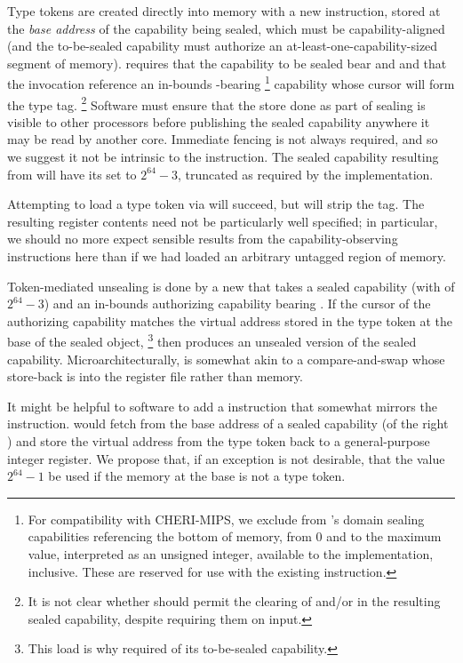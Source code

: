 Type tokens are created directly into memory with a new 
instruction, stored at the \emph{base address} of the capability
being sealed, which must be capability-aligned (and the to-be-sealed
capability must authorize an at-least-one-capability-sized segment of
memory).   requires that the capability to be sealed
bear \cappermL and \cappermS and that the invocation reference an
in-bounds \cappermSeal-bearing%
%
\footnote{For compatibility with CHERI-MIPS, we exclude from
's domain sealing capabilities referencing the
bottom of memory, from $0$ and to the maximum \cotype{} value, interpreted
as an unsigned integer, available to the implementation, inclusive. These are
reserved for use with the existing  instruction.}
%
capability whose cursor will form the type tag.%
%
\footnote{It is not clear whether  should permit the
clearing of \cappermL and/or \cappermS in the resulting sealed
capability, despite requiring them on input.}
%
Software must ensure that the store done as part of sealing is visible to
other processors before publishing the sealed capability anywhere it may be
read by another core.  Immediate fencing is not always required, and so we
suggest it not be intrinsic to the  instruction.
%
The sealed capability resulting from  will have its
\cotype{} set to $2^{64} - 3$, truncated as required by the implementation.

Attempting to load a type token via  will succeed, but will
strip the tag.  The resulting register contents need not be particularly
well specified; in particular, we should no more expect sensible results
from the capability-observing instructions here than if we had loaded an
arbitrary untagged region of memory.

Token-mediated unsealing is done by a new  that
takes a sealed capability (with \cotype{} of $2^{64} - 3$)
and an in-bounds authorizing capability bearing
\cappermUnseal.  If the cursor of the authorizing capability matches the
virtual address stored in the type token at the base of the sealed object,%
%
\footnote{This load is why  required \cappermL of
its to-be-sealed capability.}
%
then  produces an unsealed version of the sealed
capability.  Microarchitecturally,  is somewhat akin to a
compare-and-swap whose store-back is into the register file rather than
memory.

It might be helpful to software to add a 
instruction that
somewhat mirrors the  instruction.
 would fetch from the base address of a
sealed capability (of the right \cotype{}) and store
the virtual address from the type token back to a general-purpose
integer register.
We propose that, if an exception is not desirable, that the value $2^{64} - 1$ be
used if the memory at the base is not a type token.


